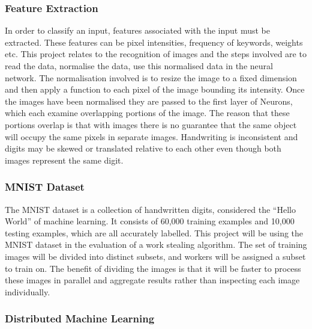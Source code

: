 \documentclass[12pt]{article}
\begin{document}
\subsubsection{Feature Extraction}
In order to classify an input, features associated with the input must be extracted. These features can be pixel intensities, frequency of keywords, weights etc. This project relates to the recognition of images and the steps involved are to read the data, normalise the data, use this normalised data in the neural network. The normalisation involved is to resize the image to a fixed dimension and then apply a function to each pixel of the image bounding its intensity.
\newline
\newline
Once the images have been normalised they are passed to the first layer of Neurons, which each examine overlapping portions of the image. The reason that these portions overlap is that with images there is no guarantee that the same object will occupy the same pixels in separate images. Handwriting is inconsistent and digits may be skewed or translated relative to each other even though both images represent the same digit.

\subsubsection{MNIST Dataset}
The MNIST dataset is a collection of handwritten digits, considered the ``Hello World'' of machine learning. It consists of 60,000 training examples and 10,000 testing examples, which are all accurately labelled. This project will be using the MNIST dataset in the evaluation of a work stealing algorithm. The set of training images will be divided into distinct subsets, and workers will be assigned a subset to train on. The benefit of dividing the images is that it will be faster to process these images in parallel and aggregate results rather than inspecting each image individually.

\subsubsection{Distributed Machine Learning}
\end{document}
